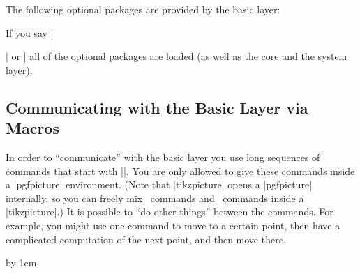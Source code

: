 The following optional packages are provided by the basic layer:

If you say |\usepackage{pgf}| or | all of the optional
packages are loaded (as well as the core and the system layer).


\subsection{Communicating with the Basic Layer via Macros}

In order to ``communicate'' with the basic layer you use long
sequences of commands that start with |\pgf|. You are only allowed to
give these commands inside a |{pgfpicture}| environment. (Note that
|{tikzpicture}| opens a |{pgfpicture}| internally, so you can freely
mix \pgfname\ commands and \tikzname\ commands inside a
|{tikzpicture}|.) It is possible to ``do other things'' between the
commands. For example, you might use one command to move to a certain
point, then have a complicated computation of the next point, and then
move there. 

\begin{codeexample}[]
\newdimen\myypos
\begin{pgfpicture}
  \pgfpathmoveto{\pgfpoint{0cm}{\myypos}}
  \pgfpathlineto{\pgfpoint{1cm}{\myypos}}
  \advance \myypos by 1cm
  \pgfpathlineto{\pgfpoint{1cm}{\myypos}}
  \pgfpathclose
\end{pgfpicture}
\end{codeexample}

